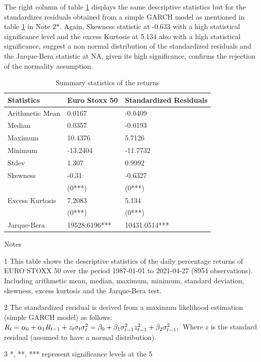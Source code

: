 \documentclass[a4paper, twoside]{templates/ociamthesis}
\begin{document}
\noindent The right column of table \ref{tab:dsTable} displays the same descriptive statistics but for the standardizes residuals obtained from a simple GARCH model as mentioned in table \ref{tab:dsTable} in Note 2\(*\). Again, Skewness statistic at -0.633 with a high statistical significance level and the excess Kurtosis at 5.134 also with a high statistical significance, suggest a non normal distribution of the standardized residuals and the Jarque-Bera statistic at NA, given its high significance, confirms the rejection of the normality assumption.

\begin{table}[h!]

\caption{\label{tab:dsTable}Summary statistics of the returns}
\centering
\begin{threeparttable}
\begin{tabular}[t]{lll}
\toprule
Statistics & Euro Stoxx 50 & Standardized Residuals\\
\midrule
Arithmetic Mean & 0.0167 & -0.0409\\
Median & 0.0357 & -0.0193\\
Maximum & 10.4376 & 5.7126\\
Minimum & -13.2404 & -11.7732\\
Stdev & 1.307 & 0.9992\\
\addlinespace
Skewness & -0.31 & -0.6327\\
 & (0***) & (0***)\\
Excess Kurtosis & 7.2083 & 5.134\\
 & (0***) & (0***)\\
Jarque-Bera & 19528.6196*** & 10431.0514***\\
\bottomrule
\end{tabular}
\begin{tablenotes}
\item Notes
\item[1] This table shows the descriptive statistics of the daily percentage returns of EURO STOXX 50 over the period 1987-01-01 to 2021-04-27 (8954 observations). Including arithmetic mean, median, maximum, minimum, standard deviation, skewness, excess kurtosis and the Jarque-Bera test.
\item[2] The standardized residual is derived from a maximum likelihood estimation (simple GARCH model) as follows:  $ R_t=\alpha_0+\alpha_1 R_{t-1}+z_t \sigma_t \\ \sigma_t^2=\beta_0+\beta_1 \sigma_{t-1}^2 z_{t-1}^2+\beta_2 \sigma_{t-1}^2, \\$ Where $z$ is the standard residual (assumed to have a normal distribution).
\item[3] *, **, *** represent significance levels at the 5%
\end{tablenotes}
\end{threeparttable}
\end{table}
\end{document}
